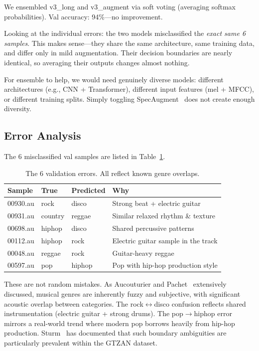 We ensembled v3\_long and v3\_augment via soft voting (averaging softmax probabilities). Val accuracy: 94\%---no improvement.

Looking at the individual errors: the two models misclassified the \emph{exact same 6 samples}. This makes sense---they share the same architecture, same training data, and differ only in mild augmentation. Their decision boundaries are nearly identical, so averaging their outputs changes almost nothing.

For ensemble to help, we would need genuinely diverse models: different architectures (e.g., CNN + Transformer), different input features (mel + MFCC), or different training splits. Simply toggling SpecAugment~\cite{park2019specaugment} does not create enough diversity.

\subsection{Error Analysis}

The 6 misclassified val samples are listed in Table~\ref{tab:errors}.

\begin{table}[h]
\centering
\caption{The 6 validation errors. All reflect known genre overlaps.}
\label{tab:errors}
\begin{tabular}{@{}llll@{}}
\toprule
Sample & True & Predicted & Why \\
\midrule
00930.au & rock & disco & Strong beat + electric guitar \\
00931.au & country & reggae & Similar relaxed rhythm \& texture \\
00698.au & hiphop & disco & Shared percussive patterns \\
00112.au & hiphop & rock & Electric guitar sample in the track \\
00048.au & reggae & rock & Guitar-heavy reggae \\
00597.au & pop & hiphop & Pop with hip-hop production style \\
\bottomrule
\end{tabular}
\end{table}

These are not random mistakes. As Aucouturier and Pachet~\cite{aucouturier2003representing} extensively discussed, musical genres are inherently fuzzy and subjective, with significant acoustic overlap between categories. The rock$\leftrightarrow$disco confusion reflects shared instrumentation (electric guitar + strong drums). The pop$\to$hiphop error mirrors a real-world trend where modern pop borrows heavily from hip-hop production. Sturm~\cite{sturm2013gtzan} has documented that such boundary ambiguities are particularly prevalent within the GTZAN dataset.

